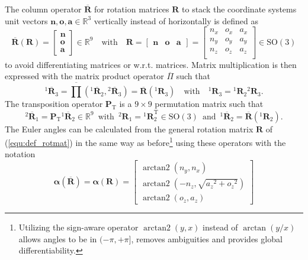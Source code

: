 \documentclass{svproc}
\newcommand{\bm}[1]{\boldsymbol{#1}}
\DeclareMathOperator{\arctantwo}{arctan2}
\newcommand{\rotmat}[2]{{{ }^{#1}\boldsymbol{R}}_{#2}}
\newcommand{\rotmato}[2]{{{ }^{#1}\boldsymbol{\overline{R}}}_{#2}}
\newcommand{\transp}[0]{{\mathrm{T}}}
\begin{document}
The column operator $\overline{\bm{R}}$ for rotation matrices $\bm{R}$ to stack the coordinate systems unit vectors $\bm{n},\bm{o},\bm{a} \in {\mathbb{R}}^{3}$ vertically instead of horizontally is defined as
%
\begin{equation}
\overline{\bm{R}}(\bm{R})=\begin{bmatrix}
\bm{n} \\ \bm{o} \\ \bm{a}
\end{bmatrix} \in {\mathbb{R}}^{9}
\quad
\mathrm{with}
\quad
\bm{R}=\begin{bmatrix}
\bm{n} & \bm{o} & \bm{a}
\end{bmatrix}
=
\begin{bmatrix}
{n_x}&{o_x}&{a_x} \\
{n_y}&{o_y}&{a_y} \\ 
{n_z}&{o_z}&{a_z} \\ 
\end{bmatrix}
 \in \mathrm{SO}(3)
\label{equ:def_rotmat}
\end{equation}
%
to avoid differentiating matrices or w.r.t. matrices.
Matrix multiplication is then expressed with the matrix product operator $\overline{\Pi}$
%
such that
%
\begin{equation}
\rotmato{1}{3}
=
\overline{\prod}\left( \rotmato{1}{2}, \rotmato{2}{3}\right)
=
\overline{\bm{R}}(\rotmat{1}{3})
\quad
\mathrm{with}
\quad
\rotmat{1}{3}
=
\rotmat{1}{2}
\rotmat{2}{3}.
\label{equ:matprod}
\end{equation}
%
The transposition operator $\bm{P}_\transp$ is a $9 \times 9$ permutation matrix such that
%
\begin{equation}
\rotmato{2}{1}
=
\bm{P}_\transp \rotmato{1}{2}
\in {\mathbb{R}}^{9}
\enspace
\mathrm{with}
\enspace
\rotmat{2}{1}
=
\rotmat{1}{2}^\transp
\in \mathrm{SO}(3)
\enspace
\mathrm{and}
\enspace
\rotmato{1}{2}=\overline{\bm{R}}(\rotmat{1}{2})
.
\end{equation}
%
The Euler angles can be calculated from the general rotation matrix $\bm{R}$ of (\ref{equ:def_rotmat}) in the same way as before\footnote{Utilizing the sign-aware operator $\arctantwo(y,x)$ instead of $\arctan(y/x)$ allows angles to be in $(-\pi,+\pi]$, removes ambiguities and provides global differentiability.} using these operators with the notation
%
\begin{equation}
\bm{\alpha}(\overline{\bm{R}})
=
\bm{\alpha}(\bm{R})
=
\begin{bmatrix}
\arctantwo \left( {n_y} , { n_x} \right) \\ 
\arctantwo \left( -{n_z} , \sqrt {{{a_z}}^{2}+{{ o_z}}^{2}} \right) \\ 
\arctantwo \left( {o_z} , {a_z} \right)
\end{bmatrix}
\label{equ:alpha_def_rotmat_zyx}
\end{equation}
\end{document}
